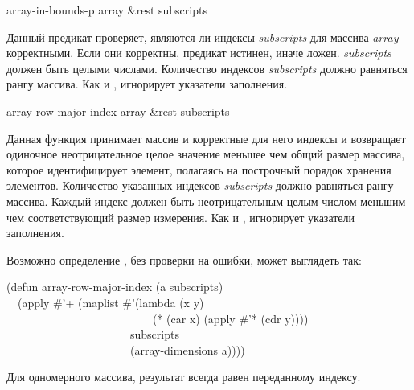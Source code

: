 \begin{defun}[Функция]
array-in-bounds-p array &rest subscripts

Данный предикат проверяет, являются ли индексы \emph{subscripts} для массива
\emph{array} корректными.
Если они корректны, предикат истинен, иначе ложен. \emph{subscripts} должен
быть целыми числами. Количество индексов \emph{subscripts} должно равняться
рангу массива.
Как и ,  игнорирует указатели заполнения.
\end{defun}

\begin{defun}[Функция]
array-row-major-index array &rest subscripts

Данная функция принимает массив и корректные для него индексы и возвращает
одиночное неотрицательное целое значение меньшее чем общий размер массива,
которое идентифицирует элемент, полагаясь на построчный порядок хранения
элементов.
Количество указанных индексов \emph{subscripts} должно равняться рангу массива.
Каждый индекс должен быть неотрицательным целым числом меньшим чем соответствующий
размер измерения.
Как и ,  игнорирует указатели заполнения.

Возможно определение , без проверки на ошибки, может
выглядеть так:
\begin{lisp}
(defun array-row-major-index (a  subscripts) \\
~~(apply \#'+ (maplist \#'(lambda (x y) \\
~~~~~~~~~~~~~~~~~~~~~~~~~~(* (car x) (apply \#'* (cdr y)))) \\
~~~~~~~~~~~~~~~~~~~~~~subscripts \\
~~~~~~~~~~~~~~~~~~~~~~(array-dimensions a))))
\end{lisp}
Для одномерного массива, результат  всегда равен
переданному индексу.
\end{defun}

